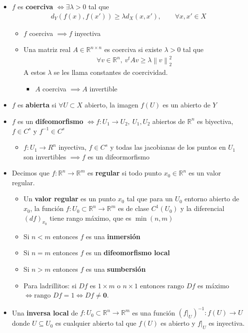 \documentclass[a4paper,twocolumn]{extarticle}
\newcommand{\R}{\mathbb{R}}
\newcommand{\norma}[1]{\left\lVert#1\right\rVert}
\begin{document}
\begin{itemize}
	\item $f$ es \textbf{coerciva} $\iff \exists \lambda > 0$ tal que
	\begin{align*}
		d_Y(f(x), f(x')) \geq \lambda d_X(x,x'),\qquad \forall x,x' \in X
	\end{align*}
	\begin{itemize}
		\item $f$ coerciva $\implies f$ inyectiva
		\item Una matriz real $A \in \R^{n\times n}$ es coerciva si existe $\lambda > 0$ tal que
		\begin{align*}
			\forall v \in \R^n,\ v^tAv \geq \lambda \norma{v}_2^2
		\end{align*}
		A estos $\lambda$ se les llama constantes de coercividad.
		\begin{itemize}
			\item $A$ coerciva $\implies A$ invertible
		\end{itemize}
	\end{itemize}
	\item $f$ es \textbf{abierta} si $\forall U \subset X$ abierto, la imagen $f(U)$ es un abierto de $Y$
	\item $f$ es un \textbf{difeomorfismo} $\iff f: U_1 \to U_2,\ U_1,U_2$ abiertos de $\R^n$ es biyectiva, $f \in C^s$ y $f^{-1} \in C^s$
	\begin{itemize}
		\item $f:U_1 \to R^n$ inyectiva, $f \in C^s$ y todas las jacobianas de los puntos en $U_1$ son invertibles $\implies f$ es un difeormorfismo
	\end{itemize}

	\item Decimos que $f:\R^n \to \R^m$ es \textbf{regular} si todo punto $x_0 \in \R^n$ es un valor regular.
	\begin{itemize}
		\item Un \textbf{valor regular} es un punto $x_0$ tal que para un $U_0$ entorno abierto de $x_0$, la función $f:U_0 \subset \R^n \to \R^m$ es de clase $C^1(U_0)$ y la diferencial $(df)_{x_0}$ tiene rango máximo, que es $\min(n, m)$
		\item Si $n < m$ entonces $f$ es una \textbf{inmersión}
		\item Si $n = m$ entonces $f$ es un \textbf{difeomorfismo local}
		\item Si $n > m$ entonces $f$ es una \textbf{sumbersión}
		\item Para ladrillitos: si $Df$ es $1\times m$ o $n \times 1$ entonces $\text{rango } Df$ es máximo $\iff \text{rango } Df = 1 \iff Df \neq \mathbf{0}$.
	\end{itemize}
	\item Una \textbf{inversa local} de $f:U_0 \subset \R^n \to \R^m$ es una función $(f|_U)^{-1} : f(U) \to U$ donde $U \subseteq U_0$ es cualquier abierto tal que $f(U)$ es abierto y $f|_U$ es inyectiva.

\end{itemize}
\end{document}
